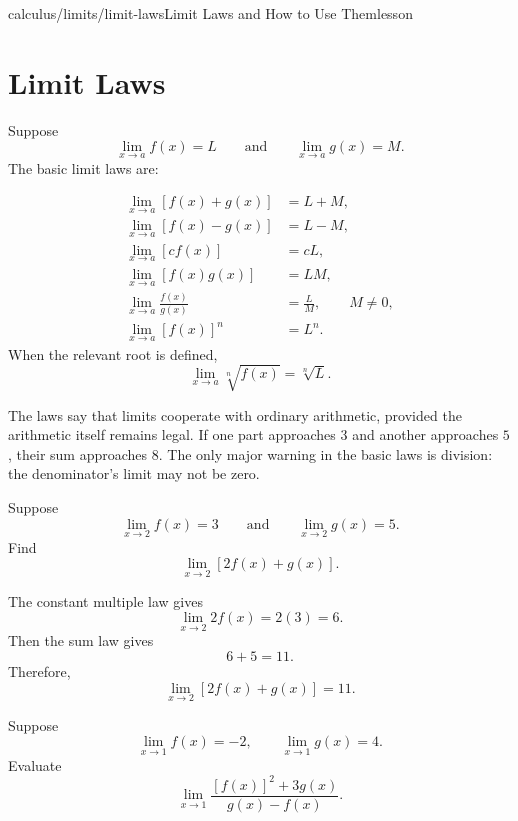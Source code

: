 \begin{webpage}{calculus/limits/limit-laws}{Limit Laws and How to Use Them}{lesson}
\section{Limit Laws}


Suppose
\[
  \lim_{x\to a}f(x)=L
  \qquad\text{and}\qquad
  \lim_{x\to a}g(x)=M.
\]
The basic limit laws are:

\begin{bgtheorem}[title={Limit Laws}]
\begin{align*}
\lim_{x\to a}[f(x)+g(x)]&=L+M,\\
\lim_{x\to a}[f(x)-g(x)]&=L-M,\\
\lim_{x\to a}[cf(x)]&=cL,\\
\lim_{x\to a}[f(x)g(x)]&=LM,\\
\lim_{x\to a}\frac{f(x)}{g(x)}&=\frac{L}{M},\qquad M\ne0,\\
\lim_{x\to a}[f(x)]^n&=L^n.
\end{align*}
When the relevant root is defined,
\[
  \lim_{x\to a}\sqrt[n]{f(x)}=\sqrt[n]{L}.
\]
\end{bgtheorem}

\begin{bgconcept}
The laws say that limits cooperate with ordinary arithmetic, provided the arithmetic itself remains legal. If one part approaches \(3\) and another approaches \(5\), their sum approaches \(8\). The only major warning in the basic laws is division: the denominator's limit may not be zero.
\end{bgconcept}

\begin{bgguided}[title={Building a limit from known pieces}]
Suppose
\[
  \lim_{x\to2}f(x)=3
  \qquad\text{and}\qquad
  \lim_{x\to2}g(x)=5.
\]
Find
\[
  \lim_{x\to2}[2f(x)+g(x)].
\]

\begin{bgsolution}
The constant multiple law gives
\[
  \lim_{x\to2}2f(x)=2(3)=6.
\]
Then the sum law gives
\[
  6+5=11.
\]
Therefore,
\[
  \boxed{\lim_{x\to2}[2f(x)+g(x)]=11}.
\]
\end{bgsolution}
\end{bgguided}

\begin{bgexample}[title={Several laws at once}]
Suppose
\[
  \lim_{x\to1}f(x)=-2,
  \qquad
  \lim_{x\to1}g(x)=4.
\]
Evaluate
\[
  \lim_{x\to1}\frac{[f(x)]^2+3g(x)}{g(x)-f(x)}.
\]


\end{bgexample}
\end{webpage}
